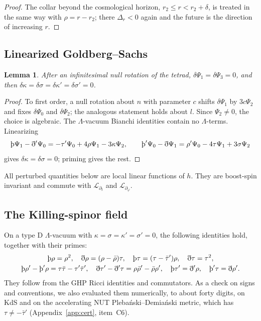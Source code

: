 \documentclass[11pt]{amsart}
\newtheorem{lemma}[theorem]{Lemma}
\theoremstyle{definition}
\theoremstyle{remark}
\numberwithin{equation}{section}
\newcommand{\Th}{\text{\th}}
\newcommand{\cL}{\mathcal{L}}
\begin{document}
\begin{proof}
The collar beyond the cosmological horizon, $r_2\le r<r_2+\delta$, is treated in the same way with $\rho=r-r_2$; there
$\Delta_r<0$ again and the future is the direction of increasing $r$.
\end{proof}

\subsection{Linearized Goldberg--Sachs}
\begin{lemma}\label{lem:GS}
After an infinitesimal null rotation of the tetrad, $\delta\Psi_1=\delta\Psi_3=0$, and then
$\delta\kappa=\delta\sigma=\delta\kappa'=\delta\sigma'=0$.
\end{lemma}
\begin{proof}
To first order, a null rotation about $n$ with parameter $c$ shifts $\delta\Psi_1$ by $3c\Psi_2$ and fixes
$\delta\Psi_0$ and $\delta\Psi_2$; the analogous statement holds about $l$. Since $\Psi_2\ne0$, the choice is
algebraic. The $\Lambda$-vacuum Bianchi identities contain no $\Lambda$-terms. Linearizing
\[
\Th\Psi_1-\eth'\Psi_0=-\tau'\Psi_0+4\rho\Psi_1-3\kappa\Psi_2,\qquad
\Th'\Psi_0-\eth\Psi_1=\rho'\Psi_0-4\tau\Psi_1+3\sigma\Psi_2
\]
gives $\delta\kappa=\delta\sigma=0$; priming gives the rest.
\end{proof}

All perturbed quantities below are local linear functions of $h$. They are boost-spin invariant and commute with
$\cL_{\partial_t}$ and $\cL_{\partial_\varphi}$.

\subsection{The Killing-spinor field}
On a type D $\Lambda$-vacuum with $\kappa=\sigma=\kappa'=\sigma'=0$, the following identities hold, together with
their primes:
\begin{gather*}
\Th\rho=\rho^2,\quad\eth\rho=(\rho-\bar\rho)\tau,\quad\Th\tau=(\tau-\bar\tau')\rho,\quad\eth\tau=\tau^2,\\
\Th\rho'-\Th'\rho=\tau\bar\tau-\tau'\bar\tau',\quad\eth\tau'-\eth'\tau=\rho\bar\rho'-\bar\rho\rho',\quad
\Th\tau'=\eth'\rho,\quad\Th'\tau=\eth\rho'.
\end{gather*}
They follow from the GHP Ricci identities and commutators. As a check on signs and conventions, we also evaluated
them numerically, to about forty digits, on KdS and on the accelerating NUT Pleba\'nski--Demia\'nski metric, which has
$\tau\ne-\bar\tau'$ (Appendix~\ref{app:cert}, item~C6).
\end{document}
